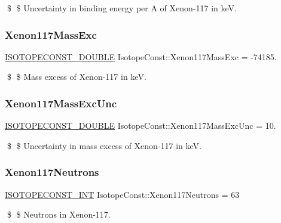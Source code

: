 \$ \$ Uncertainty in binding energy per A of Xenon-\/117 in keV. \mbox{\label{group___isotope_const-_xenon-_xe117_ga78c9b7effaed44a42cca752e9748326b}} 
\subsubsection{\texorpdfstring{Xenon117\+Mass\+Exc}{Xenon117MassExc}}
{\footnotesize\ttfamily \mbox{\hyperlink{group___isotope_const-_macros_ga8f45a7272ce02c0b4c65c44636ed719a}{I\+S\+O\+T\+O\+P\+E\+C\+O\+N\+S\+T\+\_\+\+D\+O\+U\+B\+LE}} Isotope\+Const\+::\+Xenon117\+Mass\+Exc = -\/74185.}

\$ \$ Mass excess of Xenon-\/117 in keV. \mbox{\label{group___isotope_const-_xenon-_xe117_ga5fa641b34e99d09f19fc79a037ec99e7}} 
\subsubsection{\texorpdfstring{Xenon117\+Mass\+Exc\+Unc}{Xenon117MassExcUnc}}
{\footnotesize\ttfamily \mbox{\hyperlink{group___isotope_const-_macros_ga8f45a7272ce02c0b4c65c44636ed719a}{I\+S\+O\+T\+O\+P\+E\+C\+O\+N\+S\+T\+\_\+\+D\+O\+U\+B\+LE}} Isotope\+Const\+::\+Xenon117\+Mass\+Exc\+Unc = 10.}

\$ \$ Uncertainty in mass excess of Xenon-\/117 in keV. \mbox{\label{group___isotope_const-_xenon-_xe117_ga0b56ce1e893ba2016dbd75a2ed2c52f1}} 
\subsubsection{\texorpdfstring{Xenon117\+Neutrons}{Xenon117Neutrons}}
{\footnotesize\ttfamily \mbox{\hyperlink{group___isotope_const-_macros_ga5f18360b3e99483a35c32d789e62621c}{I\+S\+O\+T\+O\+P\+E\+C\+O\+N\+S\+T\+\_\+\+I\+NT}} Isotope\+Const\+::\+Xenon117\+Neutrons = 63}

\$ \$ Neutrons in Xenon-\/117. \mbox{\label{group___isotope_const-_xenon-_xe117_ga416310717771c3e1d975a97d3aa678a6}} 
